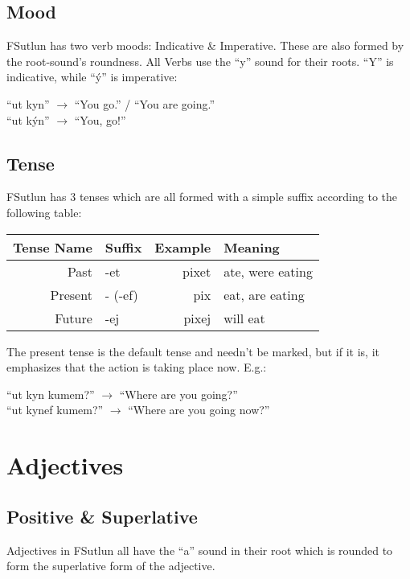 \documentclass{book}
\begin{document}
\subsection{Mood}
FSutlun has two verb moods: Indicative \& Imperative. These are also formed by the root-sound's roundness.
All Verbs use the ``y'' sound for their roots. ``Y'' is indicative, while ``ý'' is imperative:

\begin{center}
    ``ut kyn'' $\rightarrow$ ``You go.'' / ``You are going.'' \\
    ``ut kýn'' $\rightarrow$ ``You, go!''
\end{center}

\subsection{Tense}
FSutlun has 3 tenses which are all formed with a simple suffix according to the following table:

\begin{center}
    \begin{tabular}{|r|l|r|l|}
        \hline
        Tense Name  & Suffix    & Example   & Meaning \\
        \hline
        Past        & -et       & pixet     & ate, were eating \\
        Present     & - (-ef)   & pix       & eat, are eating \\
        Future      & -ej       & pixej     & will eat \\
        \hline
    \end{tabular}
\end{center}
The present tense is the default tense and needn't be marked, but if it is, it emphasizes that
the action is taking place now. E.g.:

\begin{center}
    ``ut kyn kumem?'' $\rightarrow$ ``Where are you going?'' \\
    ``ut kynef kumem?'' $\rightarrow$ ``Where are you going now?''
\end{center}


\section{Adjectives}
\subsection{Positive \& Superlative}
Adjectives in FSutlun all have the ``a'' sound in their root which is rounded to form the superlative
form of the adjective.
\end{document}
